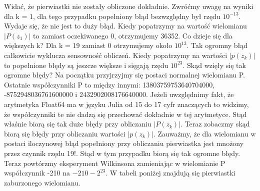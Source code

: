 \documentclass[]{article}
\begin{document}
	Widać, że pierwiastki nie zostały obliczone dokładnie. Zwróćmy uwagę na wyniki dla k = 1, dla tego przypadku popełniony błąd bezwzględny był rzędu $10^{-13}$. Wydaje się, że nie jest to duży błąd. Kiedy popatrzymy na wartość wielomianu $|P(z_1)|$ to zamiast oczekiwanego 0, otrzymujemy 36352. Co dzieje się dla większych k? Dla k = 19 zamiast 0 otrzymujemy około $10^{13}$. Tak ogromny błąd całkowicie wyklucza sensowność obliczeń. 
	Kiedy popatrzymy na wartości $|p(z_k)|$ to popełnione błędy są jeszcze większe i sięgają rzędu $10^{23}$. Skąd wzięły się tak ogromne błędy? Na początku przyjrzyjmy się postaci normalnej wielomianu P. Ostatnie współczynniki P to między innymi: 13803759753640704000, -8752948036761600000 i 2432902008176640000. Jeżeli uwzględnimy fakt, że arytmetyka Float64 ma w języku Julia od 15 do 17 cyfr znaczących to widzimy, że współczynniki te nie dadzą się przechować dokładnie w tej arytmetyce. Stąd właśnie biorą się tak duże błędy przy obliczaniu $|P(z_k)|$. Teraz zobaczmy skąd biorą się błędy przy obliczaniu wartości $|p(z_k)|$. Zauważmy, że dla wielomianu w postaci iloczynowej błąd popełniony przy obliczaniu pierwiastka jest mnożony przez czynnik rzędu 19!. Stąd w tym przypadku biorą się tak ogromne błędy. 
	Teraz powtórzmy eksperyment Wilkinsona zamieniając w wielomianie P współczynnik -210 na $-210 -2^{23}$. W tabeli poniżej znajdują się pierwiastki zaburzonego wielomianu.
	
\end{document}
